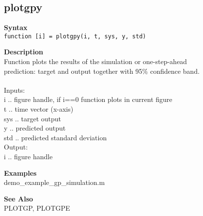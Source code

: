 \subsection*{plotgpy} \label{fun:plotgpy}


\textbf{Syntax}
\\  \texttt{function [i] = plotgpy(i, t, sys, y, std)}

\textbf{Description}
\\ Function plots the results of the simulation or one-step-ahead
\\ prediction: target and output together with 95\% confidence band.
\\
\\ Inputs:
\\ i .. figure handle, if i==0 function plots in current figure
\\ t .. time vector (x-axis)
\\ sys .. target output
\\ y .. predicted output
\\ std .. predicted standard deviation
\\ Output:
\\ i .. figure handle

\textbf{Examples}
\\ demo\_example\_gp\_simulation.m

\textbf{See Also}
\\ PLOTGP, PLOTGPE
